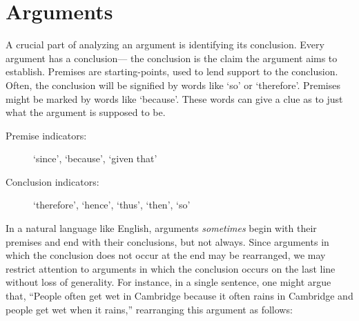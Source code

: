 \section{Arguments}

A crucial part of analyzing an argument is identifying its conclusion.
Every argument has a conclusion--- the conclusion is the claim the argument aims to establish.
Premises are starting-points, used to lend support to the conclusion.
Often, the conclusion will be signified by words like `so' or `therefore'.
Premises might be marked by words like `because'.
These words can give a clue as to just what the argument is supposed to be.

\begin{description}
  \item[Premise indicators:] `since', `because', `given that'
  \item[Conclusion indicators:] `therefore', `hence', `thus', `then', `so'
\end{description}

In a natural language like English, arguments \textit{sometimes} begin with their premises and end with their conclusions, but not always.
Since arguments in which the conclusion does not occur at the end may be rearranged, we may restrict attention to arguments in which the conclusion occurs on the last line without loss of generality.
For instance, in a single sentence, one might argue that, ``People often get wet in Cambridge because it often rains in Cambridge and people get wet when it rains,'' rearranging this argument as follows:

\begin{earg}
\end{earg}

